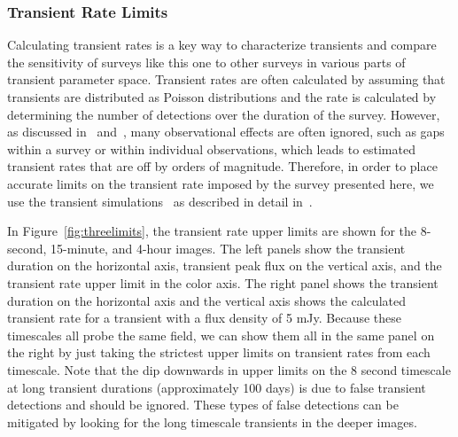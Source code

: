 \documentclass[12pt]{article}
\begin{document}
\subsubsection{Transient Rate Limits}
Calculating transient rates is a key way to characterize transients and compare the sensitivity of surveys like this one to other surveys in various parts of transient parameter space. Transient rates are often calculated by assuming that transients are distributed as Poisson distributions and the rate is calculated by determining the number of detections over the duration of the survey. However, as discussed in~\citet{2017MNRAS.465.4106C} and~\citet{2016MNRAS.459.3161C}, many observational effects are often ignored, such as gaps within a survey or within individual observations, which leads to estimated transient rates that are off by orders of magnitude. Therefore, in order to place accurate limits on the transient rate imposed by the survey presented here, we use the transient simulations~\citep{2022ascl.soft04007C} as described in detail in~\citet{2022A&C....4000629C}. 

In Figure~\ref{fig:threelimits}, the transient rate upper limits are shown for the 8-second, 15-minute, and 4-hour images. The left panels show the transient duration on the horizontal axis, transient peak flux on the vertical axis, and the transient rate upper limit in the color axis. The right panel shows the transient duration on the horizontal axis and the vertical axis shows the calculated transient rate for a transient with a flux density of 5 mJy. Because these timescales all probe the same field, we can show them all in the same panel on the right by just taking the strictest upper limits on transient rates from each timescale. Note that the dip downwards in upper limits on the 8 second timescale at long transient durations (approximately 100 days) is due to false transient detections and should be ignored. These types of false detections can be mitigated by looking for the long timescale transients in the deeper images.
\end{document}
